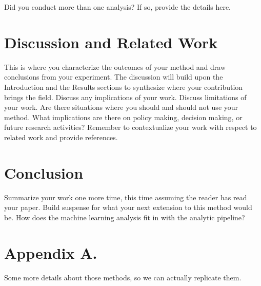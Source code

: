 \documentclass[twoside,11pt]{article}
\begin{document}
Did you conduct more than one analysis? If so, provide the details here.

\section{Discussion and Related Work} 

This is where you characterize the outcomes of your method and draw conclusions from your experiment.
The discussion will build upon the Introduction and the Results sections to synthesize where your contribution brings the field. Discuss any implications of your work. 
Discuss limitations of your work.
Are there situations where you should and should not use your method.
What implications are there on policy making, decision making, or future research activities?
Remember to contextualize your work with respect to related work and provide references.

\section{Conclusion} 
Summarize your work one more time, this time assuming the reader has read your paper.
Build suspense for what your next extension to this method would be.  How does the machine learning analysis fit in with the analytic pipeline?



\appendix
\section*{Appendix A.}
Some more details about those methods, so we can actually replicate them.
\end{document}
